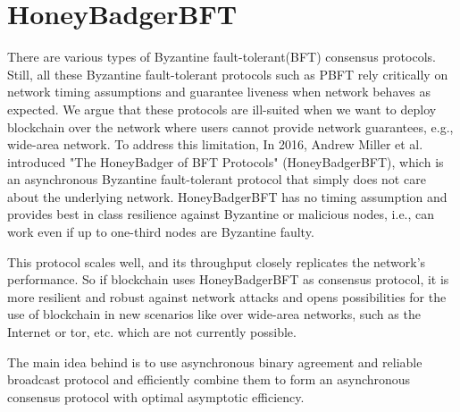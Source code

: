\section{HoneyBadgerBFT}
There are various types of Byzantine fault-tolerant(BFT)\cite{lamport2019Byzantine} consensus protocols. Still, all these Byzantine fault-tolerant protocols such as PBFT rely critically on network timing assumptions and guarantee liveness\cite{chand2020s} when network behaves as expected. We argue that these protocols are ill-suited when we want to deploy blockchain over the network where users cannot provide network guarantees, e.g., wide-area network.  To address this limitation, In 2016, Andrew Miller et al. introduced "The HoneyBadger of BFT Protocols" \cite{miller2016honey}(HoneyBadgerBFT), which is an asynchronous Byzantine fault-tolerant protocol that simply does not care about the underlying network. HoneyBadgerBFT has no timing assumption and provides best in class resilience against Byzantine or malicious nodes, i.e., can work even if up to one-third nodes are Byzantine faulty.
 
This protocol scales well, and its throughput closely replicates the network's performance. So if blockchain uses HoneyBadgerBFT as consensus protocol, it is more resilient and robust against network attacks and opens possibilities for the use of blockchain in new scenarios like over wide-area networks, such as the Internet or tor, etc. which are not currently possible.

The main idea behind is to use asynchronous binary agreement and reliable broadcast protocol and efficiently combine them to form an asynchronous consensus protocol with optimal asymptotic efficiency.


